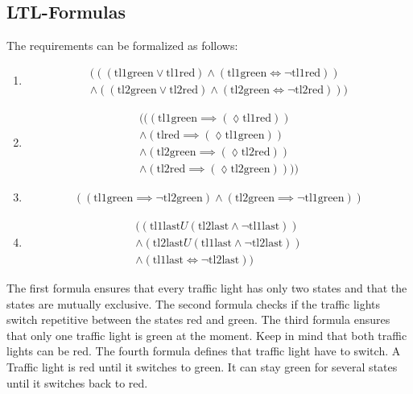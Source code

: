 \documentclass[a4paper, twoside]{article}
\begin{document}
\subsection{LTL-Formulas}
\label{sec:exampleltl}

The requirements can be formalized as follows:

\begin{enumerate}
\item 
  \begin{multline}
    (((\text{tl1green} \lor \text{tl1red}) \land (\text{tl1green}\iff \neg \text{tl1red})) \\ \land((\text{tl2green} \lor \text{tl2red})\land (\text{tl2green} \iff \neg \text{tl2red})))
  \end{multline}
\item
  \begin{multline}
    \label{eq:ltlreq1}
    (((\text{tl1green} \implies (\lozenge \text{tl1red})) \\
    \land (\text{tlred} \implies (\lozenge \text{tl1green}))\\
    \land (\text{tl2green} \implies (\lozenge \text{tl2red})) \\
    \land (\text{tl2red} \implies (\lozenge \text{tl2green}))))
  \end{multline}
\item
  \begin{multline}
    \label{eq:ltlreq2}
    ((\text{tl1green} \implies \neg \text{tl2green}) \land (\text{tl2green} \implies \neg \text{tl1green}))
  \end{multline}
\item
  \begin{multline}
    \label{eq:ltlreq3}
    ((\text{tl1last} U(\text{tl2last} \land \neg \text{tl1last})) \\
    \land (\text{tl2last} U (\text{tl1last} \land \neg \text{tl2last}))\\
\land(\text{tl1last} \iff \neg \text{tl2last}))
  \end{multline}
\end{enumerate}

The first formula ensures that every traffic light has only two states and that the states are mutually exclusive. The second formula checks if the traffic lights switch repetitive between the states red and green. The third formula ensures that only one traffic light is green at the moment. Keep in mind that both traffic lights can be red. The fourth formula defines that traffic light have to switch. A Traffic light is red until it switches to green. It can stay green for several states until it switches back to red.
\end{document}
